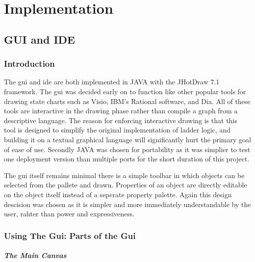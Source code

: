 \section{Implementation}
\subsection{GUI and IDE}
\label{IDE}
\subsubsection{Introduction}

The gui and ide are both implemented in JAVA with the JHotDraw 7.1 framework. The gui was decided early on to function like other popular tools for drawing state charts such as Visio, IBM's Rational software, and Dia. All of these tools are interactive in the drawing phase rather than compile a graph from a descriptive language. The reason for enforcing interactive drawing is that this tool is designed to simplify the original implementation of ladder logic, and building it on a textual graphical language will significantly hurt the primary goal of ease of use. Secondly JAVA was chosen for portability as it was simplier to test one deployment version than multiple ports for the short duration of this project.

The gui itself remains minimal 
there is a simple toolbar in which objects can be selected from the pallete and drawn. Properties of an object are directly editable on the object itself 
instead of a seperate property palette. Again this design descision was chosen as it is simpler and more immediately understandable by the user, rahter than power and expressiveness.

\subsubsection{Using The Gui: Parts of the Gui}

\subparagraph{The Main Canvas}

